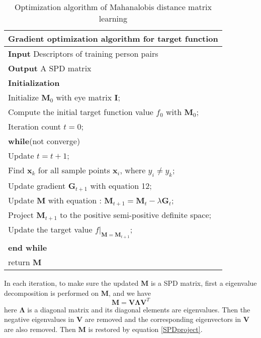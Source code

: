 \begin{table}[H] 

 \centering
 \caption{Optimization algorithm of Mahanalobis distance matrix learning}
 \label{Gradientdemo}
 \begin{tabular}{l}
 \hline 
 \multicolumn{1}{l}{\textbf{Gradient optimization algorithm for target function}} \\
 \hline
 \textbf{Input} Descriptors of training person pairs \\
 \textbf{Output} A SPD matrix\\
 \textbf{Initialization} \\
 Initialize $\bm{M}_0$ with eye matrix $\bm{I}$; \\
 Compute the initial target function value $f_0$ with $\bm{M}_0$;\\
 Iteration count  $t = 0$;\\

 \textbf{while}(not converge)\\
 \hspace{0.5cm} Update $t =  t + 1$;\\
 \hspace{0.5cm}  Find $\bm{x}_k$ for all sample points $\bm{x}_i$, where $y_i \ne y_k$;\\
 \hspace{0.5cm} Update gradient $\bm{G}_{t+1}$ with equation 12;\\
 \hspace{0.5cm}  Update $\bm{M}$ with equation : $\bm{M}_{t+1} = \bm{M}_{t} - \lambda\bm{G}_t$;\\
 \hspace{0.5cm}  Project $\bm{M}_{t+1}$ to the positive semi-positive definite space; \\ 
 \hspace{0.5cm}  Update the target value $f|_{\bm{M} = \bm{M}_{t+1}}$;\\
 \textbf{end while}  \\
 return $\bm{M}$\\
 \hline
 \end{tabular} 
 \end{table}

In each iteration, to make sure the updated $\bm{M}$ is a SPD matrix, first a eigenvalue decomposition is performed on $\bm{M}$, and we have
\begin{equation}\label{SPDproject}
\bm{M} = \bm{V}\bm{\Lambda}\bm{V}^T
\end{equation}
here $\bm{\Lambda}$ is a diagonal matrix and its diagonal elements are eigenvalues. Then the negative eigenvalues in $\bm{V}$ are removed and the corresponding eigenvectors in $\bm{V}$ are also removed. Then $\bm{M}$ is restored by equation \eqref{SPDproject}.

 
 
 
 
 
